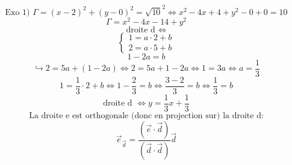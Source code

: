 \documentclass{article}
\begin{document}
\[ \text{Exo 1) } \Gamma = (x-2)^2 + (y-0)^2 = \sqrt{10}^2 \Leftrightarrow x^2 - 4x + 4 + y^2 - 0 + 0 = 10 \]
\[ \Gamma = x^2 - 4x - 14 + y^2 \]
\[ \text{droite d } \Leftrightarrow \]
\[ \begin{cases} 1 = a \cdot 2 + b \\ 2 = a \cdot 5 + b \end{cases} \]
\[ 1 - 2a = b \]
\[ \hookrightarrow 2 = 5a + (1-2a) \Leftrightarrow 2 = 5a + 1 - 2a \Leftrightarrow 1 = 3a \Leftrightarrow a = \frac{1}{3} \]
\[ 1 = \frac{1}{3} \cdot 2 + b \Leftrightarrow 1 - \frac{2}{3} = b \Leftrightarrow \frac{3-2}{3} = b \Leftrightarrow \frac{1}{3} = b \]
\[ \text{droite d } \Leftrightarrow y = \frac{1}{3}x + \frac{1}{3} \]
\[ \text{La droite e est orthogonale (donc en projection sur) la droite d:} \]
\[ \vec{e}_{\vec{d}} = \frac{(\vec{e} \cdot \vec{d})}{(\vec{d} \cdot \vec{d})} \vec{d} \]
\end{document}

